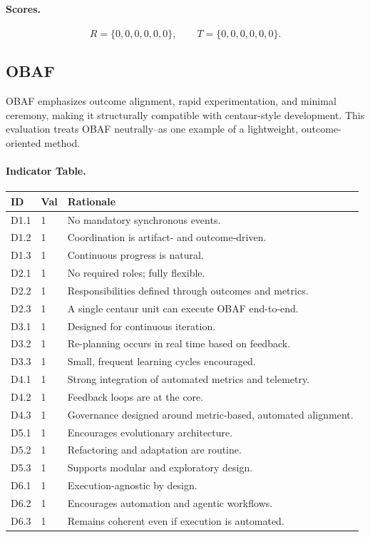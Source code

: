 \documentclass[11pt, a4paper, twocolumn]{article} %
\begin{document}
\paragraph{Scores.}

\[
R = \{0, 0, 0, 0, 0, 0\},\qquad
T = \{0, 0, 0, 0, 0, 0\}.
\]

\newpage
\subsection*{OBAF}

OBAF \citep{blomgren2025obaf} emphasizes outcome alignment, rapid
experimentation, and minimal ceremony, making it structurally compatible with
centaur-style development. This evaluation treats OBAF neutrally--as one example
of a lightweight, outcome-oriented method.

\paragraph{Indicator Table.}

\begin{table}[h]
\centering
\begin{tabular}{llp{10.5cm}}
\toprule
\textbf{ID} & \textbf{Val} & \textbf{Rationale} \\
\midrule
D1.1 & 1 & No mandatory synchronous events. \\
D1.2 & 1 & Coordination is artifact- and outcome-driven. \\
D1.3 & 1 & Continuous progress is natural. \\
\midrule
D2.1 & 1 & No required roles; fully flexible. \\
D2.2 & 1 & Responsibilities defined through outcomes and metrics. \\
D2.3 & 1 & A single centaur unit can execute OBAF end-to-end. \\
\midrule
D3.1 & 1 & Designed for continuous iteration. \\
D3.2 & 1 & Re-planning occurs in real time based on feedback. \\
D3.3 & 1 & Small, frequent learning cycles encouraged. \\
\midrule
D4.1 & 1 & Strong integration of automated metrics and telemetry. \\
D4.2 & 1 & Feedback loops are at the core. \\
D4.3 & 1 & Governance designed around metric-based, automated alignment. \\
\midrule
D5.1 & 1 & Encourages evolutionary architecture. \\
D5.2 & 1 & Refactoring and adaptation are routine. \\
D5.3 & 1 & Supports modular and exploratory design. \\
\midrule
D6.1 & 1 & Execution-agnostic by design. \\
D6.2 & 1 & Encourages automation and agentic workflows. \\
D6.3 & 1 & Remains coherent even if execution is automated. \\
\bottomrule
\end{tabular}
\end{table}
\end{document}
